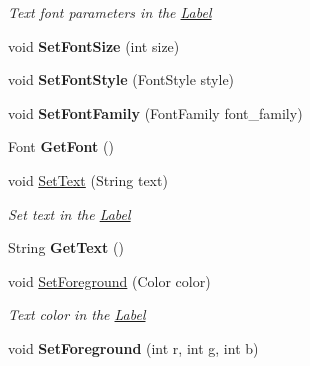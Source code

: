 \begin{DoxyCompactItemize}
\begin{DoxyCompactList}\small\item\em Text font parameters in the \mbox{\hyperlink{class_space_v_i_l_1_1_label}{Label}} \end{DoxyCompactList}\item 
\mbox{\label{class_space_v_i_l_1_1_label_a9ec22471d3fe3e1e9d7d38cbe6d29c35}} 
void {\bfseries Set\+Font\+Size} (int size)
\item 
\mbox{\label{class_space_v_i_l_1_1_label_a178c4e09dd98094f4d31756d6bd2fc2c}} 
void {\bfseries Set\+Font\+Style} (Font\+Style style)
\item 
\mbox{\label{class_space_v_i_l_1_1_label_a42159d774895d026aac0168dc6b8e511}} 
void {\bfseries Set\+Font\+Family} (Font\+Family font\+\_\+family)
\item 
\mbox{\label{class_space_v_i_l_1_1_label_a40a4bfe482dd908f4ae7261d9ef4d0f8}} 
Font {\bfseries Get\+Font} ()
\item 
void \mbox{\hyperlink{class_space_v_i_l_1_1_label_a7f6a0dc0e3f9b9a00140f099ff81f8db}{Set\+Text}} (String text)
\begin{DoxyCompactList}\small\item\em Set text in the \mbox{\hyperlink{class_space_v_i_l_1_1_label}{Label}} \end{DoxyCompactList}\item 
\mbox{\label{class_space_v_i_l_1_1_label_a40929dbc0738f76517783ed79b1d6fbb}} 
String {\bfseries Get\+Text} ()
\item 
void \mbox{\hyperlink{class_space_v_i_l_1_1_label_a0e188eabb84af83b0bedf3c59c08273b}{Set\+Foreground}} (Color color)
\begin{DoxyCompactList}\small\item\em Text color in the \mbox{\hyperlink{class_space_v_i_l_1_1_label}{Label}} \end{DoxyCompactList}\item 
\mbox{\label{class_space_v_i_l_1_1_label_a73d589aa1aece14c95e35e2257ab7646}} 
void {\bfseries Set\+Foreground} (int r, int g, int b)
\item 

\end{DoxyCompactItemize}

